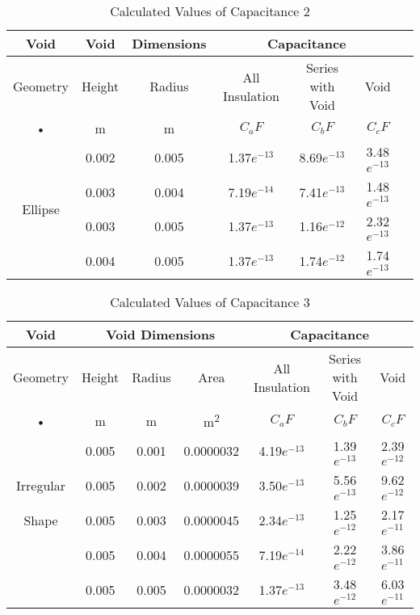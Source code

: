\begin{table}[h!]
\caption{Calculated Values of Capacitance 2}
\label{table:Calculated Values of Capacitance 2}
\centering
\begin{tabular}{|c|c|c|c|c|c|c|}
\hline 
Void & Void & Dimensions & \multicolumn{3}{c|}{Capacitance}  \\ 
\hline 
Geometry & Height & Radius &  All Insulation & Series with Void & Void \\  
• & m & m &  $C_a F$ & $C_b F$ & $C_c F$ \\ \hline \hline
\multirow{4}{*}{Ellipse}& 0.002	& 0.005	& 1.37$e^{-13}$	& 8.69$e^{-13}$	& 3.48$e^{-13}$ \\  \cline{2-6}
 		& 0.003	& 0.004	& 7.19$e^{-14}$	& 7.41$e^{-13}$	& 1.48$e^{-13}$ \\ \cline{2-6}
 		& 0.003	& 0.005	& 1.37$e^{-13}$	& 1.16$e^{-12}$	& 2.32$e^{-13}$ \\ \cline{2-6}
 		& 0.004	& 0.005	& 1.37$e^{-13}$	& 1.74$e^{-12}$	& 1.74$e^{-13}$ \\ \hline
\end{tabular} 
\end{table}

\begin{table}[h!]
\caption{Calculated Values of Capacitance 3}
\label{table:Calculated Values of Capacitance 3}
\centering
\begin{tabular}{|c|c|c|c|c|c|c|}
\hline 
Void & \multicolumn{3}{c|}{Void Dimensions} & \multicolumn{3}{c|}{Capacitance}  \\ 
\hline 
Geometry & Height & Radius & Area &  All Insulation & Series with Void & Void \\ 
• & m & m & m\textsuperscript{2} & $C_a F$ & $C_b F$ & $C_c F$ \\ \hline \hline 
			&0.005	&0.001	&0.0000032	&4.19$e^{-13}$	&1.39$e^{-13}$	&2.39$e^{-12}$ \\ \cline{2-7}
Irregular	&0.005	&0.002	&0.0000039	&3.50$e^{-13}$	&5.56$e^{-13}$	&9.62$e^{-12}$ \\ \cline{2-7}
 Shape		&0.005	&0.003	&0.0000045	&2.34$e^{-13}$	&1.25$e^{-12}$	&2.17$e^{-11}$ \\ \cline{2-7}
 			&0.005	&0.004	&0.0000055	&7.19$e^{-14}$	&2.22$e^{-12}$	&3.86$e^{-11}$ \\ \cline{2-7}
 			&0.005	&0.005	&0.0000032	&1.37$e^{-13}$	&3.48$e^{-12}$	&6.03$e^{-11}$ \\ \hline
\end{tabular} 
\end{table}

